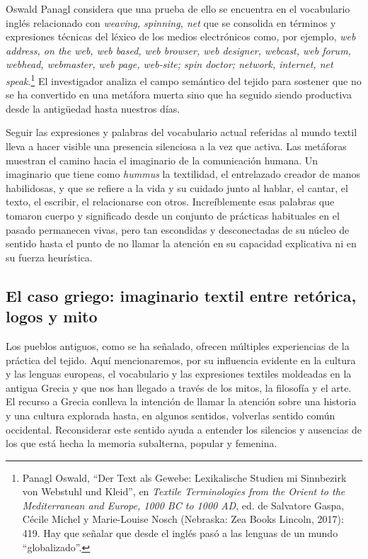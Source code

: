 \documentclass{tufte-handout}
\begin{document}
Oswald Panagl considera que una prueba de ello se encuentra en el
vocabulario inglés relacionado con \emph{weaving, spinning, net} que se
consolida en términos y expresiones técnicas del léxico de los medios
electrónicos como\emph{,} por ejemplo, \emph{web address, on the web,
web based, web browser, web designer, webcast, web forum, webhead,
webmaster, web page, web-site; spin doctor; network, internet, net
speak}.\footnote{Panagl Oswald, ``Der Text als Gewebe: Lexikalische
  Studien mi Sinnbezirk von Webstuhl und Kleid'', en \emph{Textile
  Terminologies from the Orient to the Mediterranean and Europe, 1000 BC
  to 1000 AD}, ed. de Salvatore Gaspa, Cécile Michel y Marie-Louise
  Nosch (Nebraska: Zea Books Lincoln, 2017): 419. Hay que señalar que
  desde el inglés pasó a las lenguas de un mundo ``globalizado''.} El
investigador analiza el campo semántico del tejido para sostener que no
se ha convertido en una metáfora muerta sino que ha seguido siendo
productiva desde la antigüedad hasta nuestros días.

Seguir las expresiones y palabras del vocabulario actual referidas al
mundo textil lleva a hacer visible una presencia silenciosa a la vez que
activa. Las metáforas muestran el camino hacia el imaginario de la
comunicación humana. Un imaginario que tiene como \emph{hummus} la
textilidad, el entrelazado creador de manos habilidosas, y que se
refiere a la vida y su cuidado junto al hablar, el cantar, el texto, el
escribir, el relacionarse con otros. Increíblemente esas palabras que
tomaron cuerpo y significado desde un conjunto de prácticas habituales
en el pasado permanecen vivas, pero tan escondidas y desconectadas de su
núcleo de sentido hasta el punto de no llamar la atención en su
capacidad explicativa ni en su fuerza heurística.

\hypertarget{el-caso-griego-imaginario-textil-entre-retrica-logos-y-mito}{%
\subsection{El caso griego: imaginario textil
entre retórica, logos y
mito}\label{el-caso-griego-imaginario-textil-entre-retrica-logos-y-mito}}

Los pueblos antiguos, como se ha señalado, ofrecen múltiples
experiencias de la práctica del tejido. Aquí mencionaremos, por su
influencia evidente en la cultura y las lenguas europeas, el vocabulario
y las expresiones textiles moldeadas en la antigua Grecia y que nos han
llegado a través de los mitos, la filosofía y el arte. El recurso a
Grecia conlleva la intención de llamar la atención sobre una historia y
una cultura explorada hasta, en algunos sentidos, volverlas sentido
común occidental. Reconsiderar este sentido ayuda a entender los
silencios y ausencias de los que está hecha la memoria subalterna,
popular y femenina.
\end{document}
